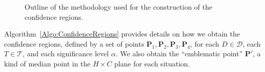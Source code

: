 \begin{figure}
	\centering
	\caption{Outline of the methodology used for the construction of the confidence regions.}
	\label{fig:methodology}
\end{figure}

Algorithm~\ref{Algo:ConfidenceRegions} provides details on how we obtain the confidence regions, defined by a set of points $\bm P_1, \bm P_2, \bm P_3, \bm P_4$, for each $D\in \mathcal D$, each $T\in \mathcal T$, and each significance level $\alpha$.
We also obtain the ``emblematic point'' $\bm P'$, a kind of median point in the $H\times C$ plane for each situation.

